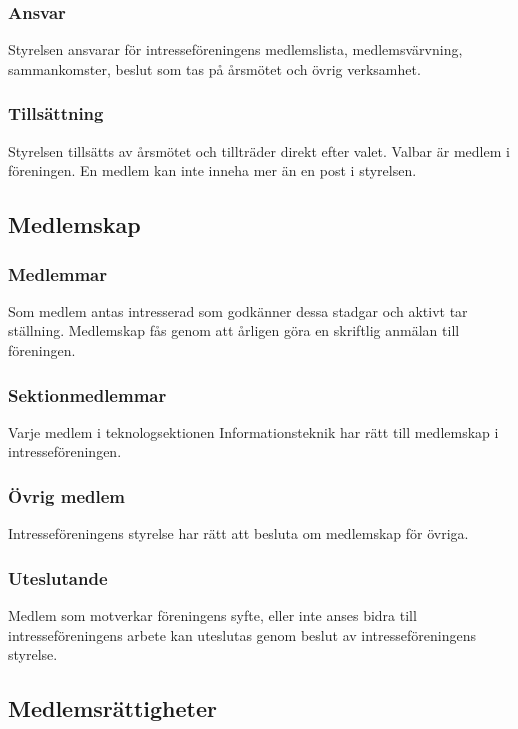 \documentclass[11pt, noincludeaddress]{classes/cthit}
\begin{document}
\subsubsection{Ansvar}
Styrelsen ansvarar för intresseföreningens medlemslista, 
medlemsvärvning, sammankomster, beslut som tas på årsmötet och 
övrig verksamhet.

\subsubsection{Tillsättning}
Styrelsen tillsätts av årsmötet och tillträder direkt efter valet. Valbar är medlem i föreningen. En medlem kan inte inneha mer än en post i styrelsen.

\subsection{Medlemskap}

\subsubsection{Medlemmar}
Som medlem antas intresserad som godkänner dessa stadgar och aktivt tar ställning. Medlemskap fås genom att årligen göra en skriftlig anmälan till föreningen.

\subsubsection{Sektionmedlemmar}
Varje medlem i teknologsektionen Informationsteknik har rätt till 
medlemskap i intresseföreningen.

\subsubsection{Övrig medlem}
Intresseföreningens styrelse har rätt att besluta om medlemskap för 
övriga.

\subsubsection{Uteslutande}
Medlem som motverkar föreningens syfte, eller inte anses bidra till 
intresseföreningens arbete kan uteslutas genom beslut av 
intresseföreningens styrelse.

\subsection{Medlemsrättigheter}
\end{document}
